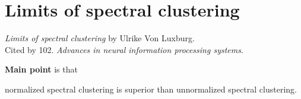 \section{Limits of spectral clustering}
\label{ch:ulrike2004}

\textit{Limits of spectral clustering} by Ulrike Von Luxburg. \\
Cited by 102. \textit{Advances in neural information processing systems}.
\newline

\textbf{Main point} is that \begin{inparaenum}
\item normalized spectral clustering is superior than unnormalized spectral clustering.
\end{inparaenum}

